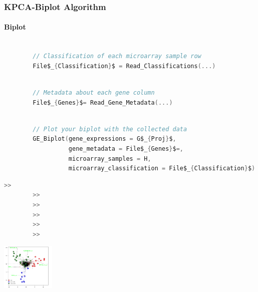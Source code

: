 \documentclass[serif]{beamer}
\newcommand{\codepause}{\pause \vspace{-0.165in} }
\begin{document}
	\begin{frame}[t, fragile]
		\frametitle{KPCA-Biplot Algorithm}
		\framesubtitle{Biplot}
		
		\begin{lstlisting}[mathescape, language=C]
		
		// Classification of each microarray sample row
		File$_{Classification}$ = Read_Classifications(...)
		\end{lstlisting}
		\codepause
		\begin{lstlisting}[mathescape, language=C]
		
		// Metadata about each gene column
		File$_{Genes}$= Read_Gene_Metadata(...)
		\end{lstlisting}
		\codepause
		\begin{lstlisting}[mathescape, language=C]
		
		// Plot your biplot with the collected data
		GE_Biplot(gene_expressions = G$_{Proj}$,
		          gene_metadata = File$_{Genes}$=,
		          microarray_samples = H,
		          microarray_classification = File$_{Classification}$)
		\end{lstlisting}
		\begin{lstlisting}[mathescape, language=C]
		>>
		>>
		>>
		>> 
		>>
		>>
		\end{lstlisting}
		\vspace{-1.17in}
		\begin{center}
		\raggedright \hspace{0.2in}
		\includegraphics[width=1.0in]{images/biplot_output}	
		\end{center}
		\codepause
		
		
	\end{frame}
	
\end{document}
